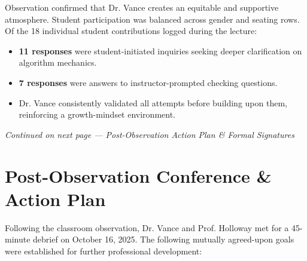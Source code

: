 \documentclass[10pt,a4paper]{article}
\begin{document}
Observation confirmed that Dr. Vance creates an equitable and supportive atmosphere. Student participation was balanced across gender and seating rows. Of the 18 individual student contributions logged during the lecture:
\begin{itemize}[label=\textcolor{TealAccent}{\small\faCircle}, leftmargin=18pt]
  \item \textbf{11 responses} were student-initiated inquiries seeking deeper clarification on algorithm mechanics.
  \item \textbf{7 responses} were answers to instructor-prompted checking questions.
  \item Dr. Vance consistently validated all attempts before building upon them, reinforcing a growth-mindset environment.
\end{itemize}

\vfill
\centerline{\small\color{TextMuted}\textit{Continued on next page --- Post-Observation Action Plan \& Formal Signatures}}
\newpage


\section{Post-Observation Conference \& Action Plan}

Following the classroom observation, Dr. Vance and Prof. Holloway met for a 45-minute debrief on October 16, 2025. The following mutually agreed-upon goals were established for further professional development:

\vspace{6pt}
\end{document}
